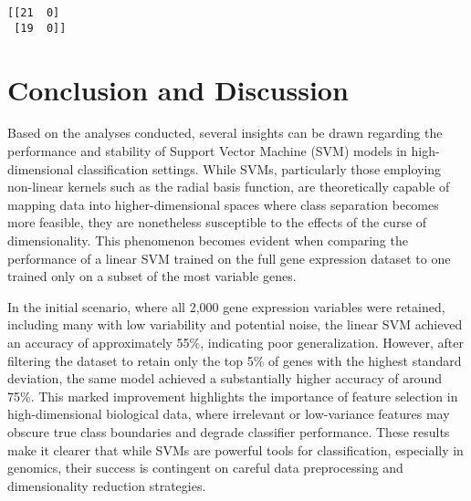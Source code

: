 \documentclass[11pt]{article}
\begin{document}
    \begin{Verbatim}[commandchars=\\\{\}]
[[21  0]
 [19  0]]
    \end{Verbatim}

    \section{Conclusion and Discussion}\label{conclusion-and-discussion}

Based on the analyses conducted, several insights can be drawn regarding
the performance and stability of Support Vector Machine (SVM) models in
high-dimensional classification settings. While SVMs, particularly those
employing non-linear kernels such as the radial basis function, are
theoretically capable of mapping data into higher-dimensional spaces
where class separation becomes more feasible, they are nonetheless
susceptible to the effects of the curse of dimensionality. This
phenomenon becomes evident when comparing the performance of a linear
SVM trained on the full gene expression dataset to one trained only on a
subset of the most variable genes.

In the initial scenario, where all 2,000 gene expression variables were
retained, including many with low variability and potential noise, the
linear SVM achieved an accuracy of approximately 55\%, indicating poor
generalization. However, after filtering the dataset to retain only the
top 5\% of genes with the highest standard deviation, the same model
achieved a substantially higher accuracy of around 75\%. This marked
improvement highlights the importance of feature selection in
high-dimensional biological data, where irrelevant or low-variance
features may obscure true class boundaries and degrade classifier
performance. These results make it clearer that while SVMs are powerful
tools for classification, especially in genomics, their success is
contingent on careful data preprocessing and dimensionality reduction
strategies.


    
    
    
\end{document}
